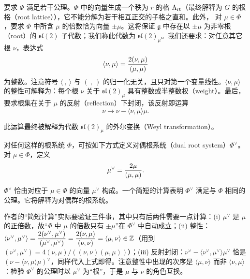 要求 $\Phi$ 满足若干公理。$\Phi$ 中的向量生成一个秩为 $r$ 的格 $\Lambda_{\rm rt}$（最终解释为 $G$ 的根格（root lattice）），它不能分解为若干相互正交的子格之直和。此外，
对 $\mu\in \Phi$，要求 $\Phi$ 中所含 $\mu$ 的倍数恰为向量 $\pm \mu$。这将保证 $\mathfrak{g}$ 中存在以 $\pm \mu$ 为非零根（root）的 $\mathfrak{sl}(2)$ 子代数；我们称此代数为 $\mathfrak{sl}(2)_\mu$。我们还要求：对任意其它根 $\nu$，表达式
\setcounter{equation}{0}
\begin{equation}\label{eq:A.1}
  \langle\nu,\mu\rangle ={2(\nu,\mu)\over (\mu,\mu)}
\end{equation}
为整数。注意符号 $\langle~,~\rangle$ 与 $(~,~)$ 的归一化无关，且只对第一个变量线性。$\langle\nu,\mu\rangle$ 的整性可解释为：每个根 $\nu$ 关于 $\mathfrak{sl}(2)_\mu$ 具有整数或半整数权（weight）。最后，要求根集在关于 $\mu$ 的反射（reflection）下封闭，该反射即运算
\setcounter{equation}{1}
\begin{equation}\label{eq:A.2}
  \nu\to \nu-\langle\nu,\mu\rangle \mu.
\end{equation}

此运算最终被解释为代数 $\mathfrak{sl}(2)_\mu$ 的外尔变换（Weyl transformation）。

对任何这样的根系统 $\Phi$，可按如下方式定义对偶根系统（dual root system）$\Phi^\vee$。对 $\mu\in \Phi$，定义
\setcounter{equation}{2}
\begin{equation}\label{eq:A.3}
  \mu^\vee={2\mu\over (\mu,\mu)}.
\end{equation}

$\Phi^\vee$ 恰由对应于 $\mu\in\Phi$ 的向量 $\mu^\vee$ 构成。一个简短的计算表明 $\Phi^\vee$ 满足与 $\Phi$ 相同的公理。它将解释为对偶群的根系统。

\begin{yizhu}[含糊点拨]
作者的“简短计算”实际要验证三件事，其中只有后两件需要一点计算：(i) $\mu^\vee$ 是 $\mu$ 的正倍数，故“$\Phi$ 中 $\mu$ 的倍数只有 $\pm\mu$”在 $\Phi^\vee$ 中自动成立；(ii) 整性：$\langle\nu^\vee,\mu^\vee\rangle=\dfrac{2(\nu^\vee,\mu^\vee)}{(\mu^\vee,\mu^\vee)}=\dfrac{2(\nu,\mu)}{(\nu,\nu)}=\langle\mu,\nu\rangle\in{\mathbb{Z}}$（用到 $(\nu^\vee,\mu^\vee)=4(\nu,\mu)/((\nu,\nu)(\mu,\mu))$）；(iii) 反射封闭：$\nu^\vee-\langle\nu^\vee,\mu^\vee\rangle\mu^\vee$ 恰是 $(\nu-\langle\nu,\mu\rangle\mu)^\vee$，同样代入上式即得。注意整性中出现的次序是 $\langle\mu,\nu\rangle$ 而非 $\langle\nu,\mu\rangle$：检验 $\Phi^\vee$ 的公理时以 $\mu^\vee$ 为“根”，于是 $\mu$ 与 $\nu$ 的角色互换。
\end{yizhu}

